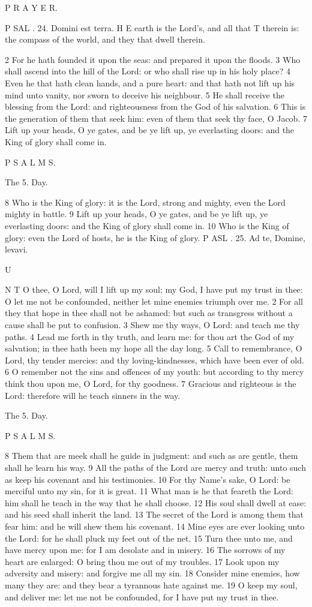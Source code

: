 P R A Y E R.

P SAL . 24. Domini est terra. H E earth is the Lord’s, and all that T therein is: the compass of the world, and they that dwell therein.

2 For he hath founded it upon the seas: and prepared it upon the floods. 3 Who shall ascend into the hill of the Lord: or who shall rise up in his holy place? 4 Even he that hath clean hands, and a pure heart: and that hath not lift up his mind unto vanity, nor sworn to deceive his neighbour. 5 He shall receive the blessing from the Lord: and righteousness from the God of his salvation. 6 This is the generation of them that seek him: even of them that seek thy face, O Jacob. 7 Lift up your heads, O ye gates, and be ye lift up, ye everlasting doors: and the King of glory shall come in.

P S A L M S.

The 5. Day.

8 Who is the King of glory: it is the Lord, strong and mighty, even the Lord mighty in battle. 9 Lift up your heads, O ye gates, and be ye lift up, ye everlasting doors: and the King of glory shall come in. 10 Who is the King of glory: even the Lord of hosts, he is the King of glory. P ASL . 25. Ad te, Domine, levavi.

U

N T O thee, O Lord, will I lift up my soul; my God, I have put my trust in thee: O let me not be confounded, neither let mine enemies triumph over me. 2 For all they that hope in thee shall not be ashamed: but such as transgress without a cause shall be put to confusion. 3 Shew me thy ways, O Lord: and teach me thy paths. 4 Lead me forth in thy truth, and learn me: for thou art the God of my salvation; in thee hath been my hope all the day long. 5 Call to remembrance, O Lord, thy tender mercies: and thy loving-kindnesses, which have been ever of old. 6 O remember not the sins and offences of my youth: but according to thy mercy think thou upon me, O Lord, for thy goodness. 7 Gracious and righteous is the Lord: therefore will he teach sinners in the way.

The 5. Day.

P S A L M S.

8 Them that are meek shall he guide in judgment: and such as are gentle, them shall he learn his way. 9 All the paths of the Lord are mercy and truth: unto such as keep his covenant and his testimonies. 10 For thy Name’s sake, O Lord: be merciful unto my sin, for it is great. 11 What man is he that feareth the Lord: him shall he teach in the way that he shall choose. 12 His soul shall dwell at ease: and his seed shall inherit the land. 13 The secret of the Lord is among them that fear him: and he will shew them his covenant. 14 Mine eyes are ever looking unto the Lord: for he shall pluck my feet out of the net. 15 Turn thee unto me, and have mercy upon me: for I am desolate and in misery. 16 The sorrows of my heart are enlarged: O bring thou me out of my troubles. 17 Look upon my adversity and misery: and forgive me all my sin. 18 Consider mine enemies, how many they are: and they bear a tyrannous hate against me. 19 O keep my soul, and deliver me: let me not be confounded, for I have put my trust in thee.

